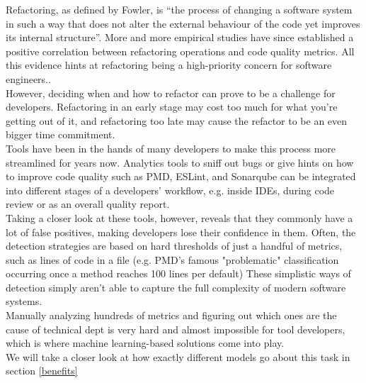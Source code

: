 Refactoring, as defined by Fowler\cite{fowler2018refactoring}, is “the process of changing a software system in such a way that does not alter the external behaviour of the code yet improves its internal structure”. More and more empirical studies have since established a positive correlation between refactoring operations and code quality metrics. All this evidence hints at refactoring being a high-priority concern for software engineers.\cite{aniche2020effectiveness}.\\
However, deciding when and how to refactor can prove to be a challenge for developers. Refactoring in an early stage may cost too much for what you're getting out of it, and refactoring too late may cause the refactor to be an even bigger time commitment.\cite{kruchten2012technical}\\
Tools have been in the hands of many developers to make this process more streamlined for years now. Analytics tools to sniff out bugs or give hints on how to improve code quality such as PMD, ESLint, and Sonarqube can be integrated into different stages of a developers' workflow, e.g. inside IDEs, during code review or as an overall quality report. \cite{aniche2020effectiveness}\\
Taking a closer look at these tools, however, reveals that they commonly have a lot of false positives, making developers lose their confidence in them. Often, the detection strategies are based on hard thresholds of just a handful of metrics, such as lines of code in a file (e.g. PMD's famous "problematic" classification occurring once a method reaches 100 lines per default)\cite{aniche2020effectiveness} These simplistic ways of detection simply aren't able to capture the full complexity of modern software systems.\\
Manually analyzing hundreds of metrics and figuring out which ones are the cause of technical dept is very hard and almost impossible for tool developers, which is where machine learning-based solutions come into play.\cite{kataoka2002refactoring}\cite{leitch2003maintainability}\\
We will take a closer look at how exactly different models go about this task in section \ref{benefits}
